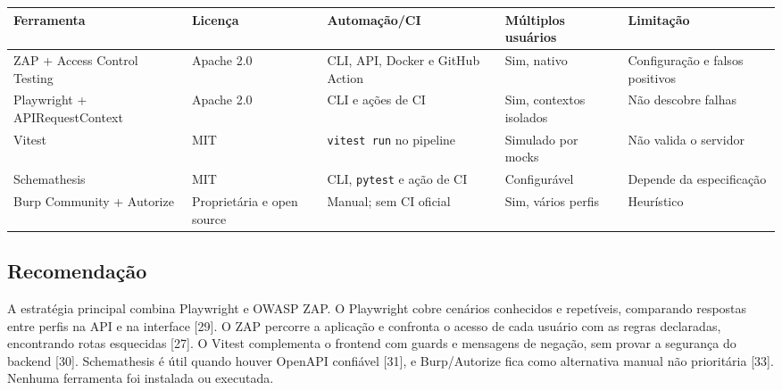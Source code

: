 {\def\LTcaptype{none} %
\begin{longtable}[]{@{}
  >{\raggedright\arraybackslash}p{}
  >{\raggedright\arraybackslash}p{}
  >{\raggedright\arraybackslash}p{}
  >{\raggedright\arraybackslash}p{}
  >{\raggedright\arraybackslash}p{}@{}}
\toprule\noalign{}
\begin{minipage}[b]{\linewidth}\raggedright
Ferramenta
\end{minipage} & \begin{minipage}[b]{\linewidth}\raggedright
Licença
\end{minipage} & \begin{minipage}[b]{\linewidth}\raggedright
Automação/\allowbreak{}CI
\end{minipage} & \begin{minipage}[b]{\linewidth}\raggedright
Múltiplos usuários
\end{minipage} & \begin{minipage}[b]{\linewidth}\raggedright
Limitação
\end{minipage} \\
\midrule\noalign{}
\endhead
\bottomrule\noalign{}
\endlastfoot
ZAP + Access Control Testing & Apache 2.0 & CLI, API, Docker e GitHub
Action & Sim, nativo & Configuração e falsos positivos \\
Playwright + APIRequestContext & Apache 2.0 & CLI e ações de CI & Sim,
contextos isolados & Não descobre falhas \\
Vitest & MIT & \texttt{vitest\ run} no pipeline & Simulado por mocks &
Não valida o servidor \\
Schemathesis & MIT & CLI, \texttt{pytest} e ação de CI & Configurável &
Depende da especificação \\
Burp Community + Autorize & Proprietária e open source & Manual; sem CI
oficial & Sim, vários perfis & Heurístico \\
\end{longtable}
}

\subsection{Recomendação}\label{recomendauxe7uxe3o}

A estratégia principal combina Playwright e OWASP ZAP. O Playwright
cobre cenários conhecidos e repetíveis, comparando respostas entre
perfis na API e na interface {[}29{]}. O ZAP percorre a aplicação e
confronta o acesso de cada usuário com as regras declaradas, encontrando
rotas esquecidas {[}27{]}. O Vitest complementa o frontend com guards e
mensagens de negação, sem provar a segurança do backend {[}30{]}.
Schemathesis é útil quando houver OpenAPI confiável {[}31{]}, e
Burp/\allowbreak{}Autorize fica como alternativa manual não prioritária {[}33{]}.
Nenhuma ferramenta foi instalada ou executada.

